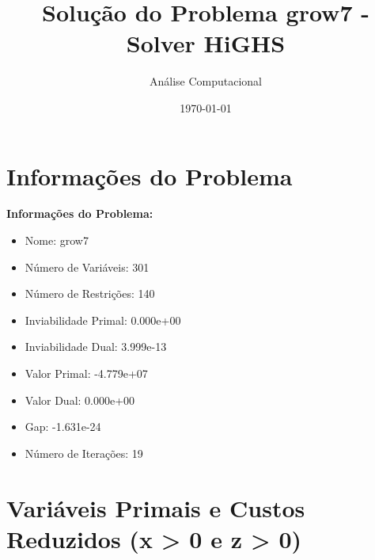 \documentclass[12pt]{article}
\title{Solução do Problema grow7 - Solver HiGHS}
\author{Análise Computacional}
\date{\today}
\begin{document}
\maketitle

\section{Informações do Problema}

\textbf{Informações do Problema:}
\begin{itemize}
\item Nome: grow7
\item Número de Variáveis: 301
\item Número de Restrições: 140
\item Inviabilidade Primal: 0.000e+00
\item Inviabilidade Dual: 3.999e-13
\item Valor Primal: -4.779e+07
\item Valor Dual: 0.000e+00
\item Gap: -1.631e-24
\item Número de Iterações: 19
\end{itemize}


\section{Variáveis Primais e Custos Reduzidos (x > 0 e z > 0)}
\end{document}
